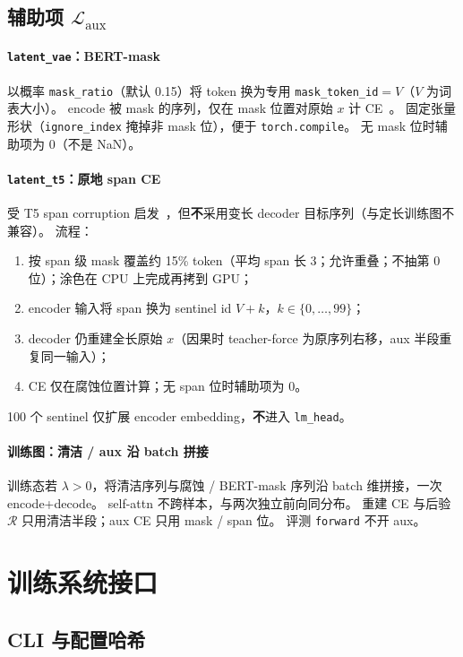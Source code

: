 \documentclass[UTF8,a4paper,11pt]{ctexart}
\begin{document}
\subsection{辅助项 $\mathcal{L}_{\mathrm{aux}}$}

\paragraph{\texttt{latent\_vae}：BERT-mask}
以概率 \texttt{mask\_ratio}（默认 0.15）将 token 换为专用 \texttt{mask\_token\_id}$=V$（$V$ 为词表大小）。
encode 被 mask 的序列，仅在 mask 位置对原始 $x$ 计 CE~\cite{devlin2019bert}。
固定张量形状（\texttt{ignore\_index} 掩掉非 mask 位），便于 \texttt{torch.compile}。
无 mask 位时辅助项为 $0$（不是 NaN）。

\paragraph{\texttt{latent\_t5}：原地 span CE}
受 T5 span corruption 启发~\cite{raffel2020t5}，但\textbf{不}采用变长 decoder 目标序列（与定长训练图不兼容）。
流程：
\begin{enumerate}
  \item 按 span 级 mask 覆盖约 15\% token（平均 span 长 3；允许重叠；不抽第 0 位）；涂色在 CPU 上完成再拷到 GPU；
  \item encoder 输入将 span 换为 sentinel id $V{+}k$，$k\in\{0,\ldots,99\}$；
  \item decoder 仍重建全长原始 $x$（因果时 teacher-force 为原序列右移，aux 半段重复同一输入）；
  \item CE 仅在腐蚀位置计算；无 span 位时辅助项为 $0$。
\end{enumerate}
100 个 sentinel 仅扩展 encoder embedding，\textbf{不}进入 \texttt{lm\_head}。

\paragraph{训练图：清洁 / aux 沿 batch 拼接}
训练态若 $\lambda{>}0$，将清洁序列与腐蚀 / BERT-mask 序列沿 batch 维拼接，一次 encode+decode。
self-attn 不跨样本，与两次独立前向同分布。
重建 CE 与后验 $\mathcal{R}$ 只用清洁半段；aux CE 只用 mask / span 位。
评测 \texttt{forward} 不开 aux。

\section{训练系统接口}

\subsection{CLI 与配置哈希}
\end{document}
